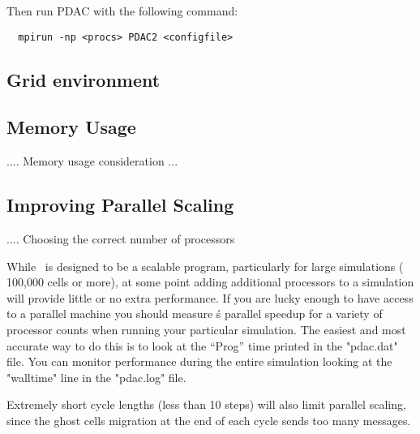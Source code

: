 Then run PDAC with the following command:

\begin{verbatim}
  mpirun -np <procs> PDAC2 <configfile>
\end{verbatim}

\subsection{Grid environment}

\subsection{Memory Usage}

.... Memory usage consideration ...

\subsection{Improving Parallel Scaling}

.... Choosing the correct number of processors

While \PDAC\ is designed to be a scalable program, particularly for
large simulations ( 100,000 cells or more), at some point adding additional
processors to a simulation will provide little or no extra performance.
If you are lucky enough to have access to a parallel machine you should
measure \PDAC\'s parallel speedup for a variety of processor counts when
running your particular simulation.  The easiest and most accurate way
to do this is to look at the ``Prog'' time printed in the "pdac.dat" file.
You can monitor performance during the entire simulation looking at
the "walltime" line in the "pdac.log" file.

Extremely short cycle lengths (less than 10 steps) will also limit
parallel scaling, since the ghost cells migration at the end of each cycle
sends too many messages.
